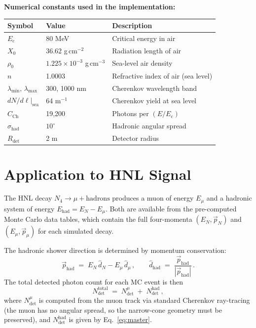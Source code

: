 \documentclass[11pt]{article}
\newcommand{\Ec}{E_{\mathrm{c}}}
\newcommand{\Ehad}{E_{\mathrm{had}}}
\newcommand{\Emu}{E_{\mu}}
\newcommand{\EHNL}{E_{N}}
\newcommand{\CCH}{C_{\mathrm{Ch}}}
\newcommand{\Rdet}{R_{\mathrm{det}}}
\newcommand{\shad}{\sigma_{\mathrm{had}}}
\begin{document}
\noindent
\textbf{Numerical constants used in the implementation:}

\begin{center}
\begin{tabular}{lll}
\toprule
Symbol & Value & Description \\
\midrule
$\Ec$ & 80 MeV & Critical energy in air \\
$X_0$ & 36.62 g\,cm$^{-2}$ & Radiation length of air \\
$\rho_0$ & $1.225 \times 10^{-3}$ g\,cm$^{-3}$ & Sea-level air density \\
$n$ & 1.0003 & Refractive index of air (sea level) \\
$\lambda_{\min},\,\lambda_{\max}$ & 300, 1000 nm & Cherenkov wavelength band \\
$dN/d\ell|_{\text{sea}}$ & 64 m$^{-1}$ & Cherenkov yield at sea level \\
$\CCH$ & 19,200 & Photons per $(E/\Ec)$ \\
$\shad$ & $10^\circ$ & Hadronic angular spread \\
$\Rdet$ & 2 m & Detector radius \\
\bottomrule
\end{tabular}
\end{center}

\section{Application to HNL Signal}
\label{sec:signal}

The HNL decay $N_4 \to \mu + \text{hadrons}$ produces a muon of energy
$\Emu$ and a hadronic system of energy $\Ehad = \EHNL - \Emu$.  Both
are available from the pre-computed Monte Carlo data tables, which
contain the full four-momenta $(E_N, \vec{p}_N)$ and
$(\Emu, \vec{p}_\mu)$ for each simulated decay.

The hadronic shower direction is determined by momentum conservation:
\begin{equation}
  \vec{p}_{\mathrm{had}} \;=\;
  \EHNL\,\hat{d}_N - \Emu\,\hat{d}_\mu\,,
  \qquad
  \hat{d}_{\mathrm{had}} \;=\;
  \frac{\vec{p}_{\mathrm{had}}}{|\vec{p}_{\mathrm{had}}|}\,.
  \label{eq:had_dir}
\end{equation}
The total detected photon count for each MC event is then
\begin{equation}
  N_{\mathrm{det}}^{\mathrm{total}}
  \;=\;
  N_{\mathrm{det}}^{\mu}
  \;+\;
  N_{\mathrm{det}}^{\mathrm{had}}\,,
\end{equation}
where $N_{\mathrm{det}}^{\mu}$ is computed from the muon track via
standard Cherenkov ray-tracing (the muon has no angular spread, so the
narrow-cone geometry must be preserved), and
$N_{\mathrm{det}}^{\mathrm{had}}$ is given by
Eq.~\eqref{eq:master}.
\end{document}
